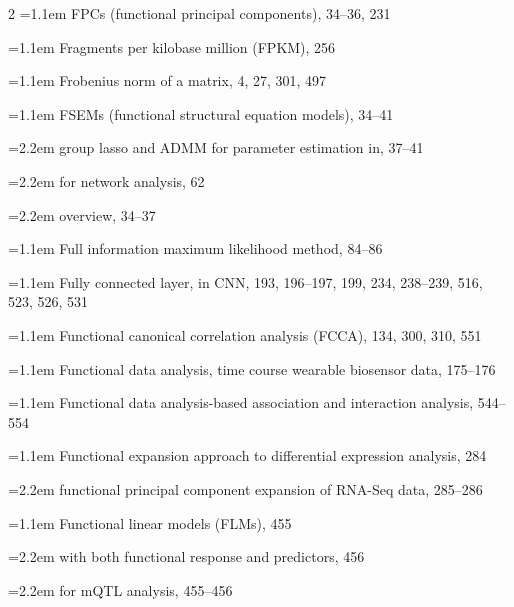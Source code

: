 \begin{multicols}{2}
\noindent\hangindent=1.1em FPCs (functional principal components), 34--36, 231\par
\noindent\hangindent=1.1em Fragments per kilobase million (FPKM), 256\par
\noindent\hangindent=1.1em Frobenius norm of a matrix, 4, 27, 301, 497\par
\noindent\hangindent=1.1em FSEMs (functional structural equation models), 34--41\par
\noindent\hangindent=2.2em \hspace*{1.1em}group lasso and ADMM for parameter estimation in, 37--41\par
\noindent\hangindent=2.2em \hspace*{1.1em}for network analysis, 62\par
\noindent\hangindent=2.2em \hspace*{1.1em}overview, 34--37\par
\noindent\hangindent=1.1em Full information maximum likelihood method, 84--86\par
\noindent\hangindent=1.1em Fully connected layer, in CNN, 193, 196--197, 199, 234, 238--239, 516, 523, 526, 531\par
\noindent\hangindent=1.1em Functional canonical correlation analysis (FCCA), 134, 300, 310, 551\par
\noindent\hangindent=1.1em Functional data analysis, time course wearable biosensor data, 175--176\par
\noindent\hangindent=1.1em Functional data analysis-based association and interaction analysis, 544--554\par
\noindent\hangindent=1.1em Functional expansion approach to differential expression analysis, 284\par
\noindent\hangindent=2.2em \hspace*{1.1em}functional principal component expansion of RNA-Seq data, 285--286\par
\noindent\hangindent=1.1em Functional linear models (FLMs), 455\par
\noindent\hangindent=2.2em \hspace*{1.1em}with both functional response and predictors, 456\par
\noindent\hangindent=2.2em \hspace*{1.1em}for mQTL analysis, 455--456\par

\end{multicols}
